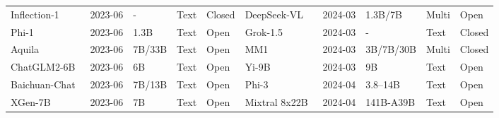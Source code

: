 \begin{table}[htbp]
{\begin{tabular}{@{} lllll | lllll @{}}
Inflection-1~\cite{inflection2023inflection1} & 2023-06 & - & Text & Closed & DeepSeek-VL~\cite{deepseekai2024deepseekvl} & 2024-03 & 1.3B/7B & Multi & Open \\
Phi-1~\cite{gunasekar2023phi1} & 2023-06 & 1.3B & Text & Open & Grok-1.5~\cite{xai2024grok15} & 2024-03 & - & Text & Closed \\
Aquila~\cite{baai2023aquila} & 2023-06 & 7B/33B & Text & Open & MM1~\cite{mckinzie2024mm1} & 2024-03 & 3B/7B/30B & Multi & Closed \\
ChatGLM2-6B~\cite{thudm2023chatglm2-6b} & 2023-06 & 6B & Text & Open & Yi-9B~\cite{young2024yi} & 2024-03 & 9B & Text & Open \\
Baichuan-Chat~\cite{baichuaninc2023baichuan7b,baichuaninc2023baichuan13b} & 2023-06 & 7B/13B & Text & Open & Phi-3~\cite{abdin2024phi3} & 2024-04 & 3.8--14B & Text & Open \\
XGen-7B~\cite{nijkamp2023xgen} & 2023-06 & 7B & Text & Open & Mixtral 8x22B~\cite{mistral2024mixtral8x22b} & 2024-04 & 141B-A39B & Text & Open \\
\bottomrule
\end{tabular}
}

\end{table}

\clearpage

